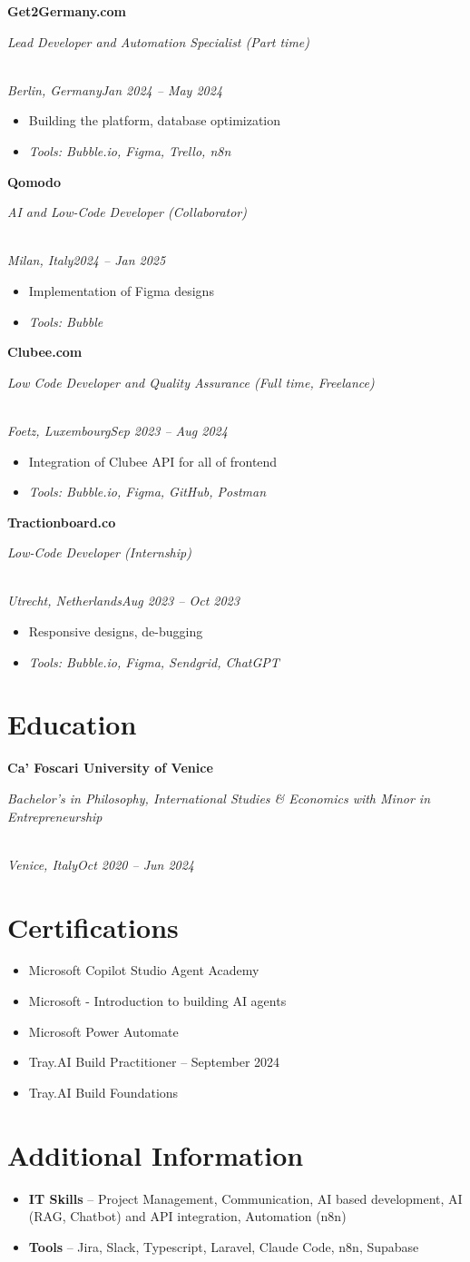 \documentclass[a4paper,10pt]{article}
\newcommand{\role}[4]{\vspace{3pt}\noindent\hspace{0.6em}\parbox[t]{0.38\textwidth}{\raggedright\textbf{#1}}\hfill\parbox[t]{0.58\textwidth}{\raggedleft\textit{#2}}\\{\textit{#3}\hfill\textit{#4}}\vspace{1pt}}
\begin{document}
\role{Get2Germany.com}{Lead Developer and Automation Specialist (Part time)}{Berlin, Germany}{Jan 2024 -- May 2024}
\begin{itemize}
\item Building the platform, database optimization
\item \textit{Tools: Bubble.io, Figma, Trello, n8n}
\end{itemize}

\role{Qomodo}{AI and Low-Code Developer (Collaborator)}{Milan, Italy}{2024 -- Jan 2025}
\begin{itemize}
\item Implementation of Figma designs
\item \textit{Tools: Bubble}
\end{itemize}

\role{Clubee.com}{Low Code Developer and Quality Assurance (Full time, Freelance)}{Foetz, Luxembourg}{Sep 2023 -- Aug 2024}
\begin{itemize}
\item Integration of Clubee API for all of frontend
\item \textit{Tools: Bubble.io, Figma, GitHub, Postman}
\end{itemize}

\role{Tractionboard.co}{Low-Code Developer (Internship)}{Utrecht, Netherlands}{Aug 2023 -- Oct 2023}
\begin{itemize}
\item Responsive designs, de-bugging
\item \textit{Tools: Bubble.io, Figma, Sendgrid, ChatGPT}
\end{itemize}

\section{Education}
\role{Ca' Foscari University of Venice}{Bachelor's in Philosophy, International Studies \& Economics with Minor in Entrepreneurship}{Venice, Italy}{Oct 2020 -- Jun 2024}

\section{Certifications}
\begin{itemize}
\item Microsoft Copilot Studio Agent Academy
\item Microsoft - Introduction to building AI agents
\item Microsoft Power Automate
\item Tray.AI Build Practitioner -- September 2024
\item Tray.AI Build Foundations
\end{itemize}

\section{Additional Information}
\begin{itemize}
\item \textbf{IT Skills} -- Project Management, Communication, AI based development, AI (RAG, Chatbot) and API integration, Automation (n8n)
\item \textbf{Tools} -- Jira, Slack, Typescript, Laravel, Claude Code, n8n, Supabase
\end{itemize}
\end{document}
